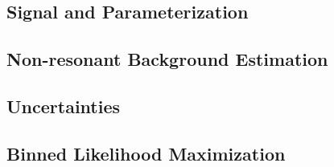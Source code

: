 

\subsection{Signal and \zjets Parameterization}

\subsection{Non-resonant Background Estimation}

\subsection{Uncertainties}

\subsection{Binned Likelihood Maximization}




